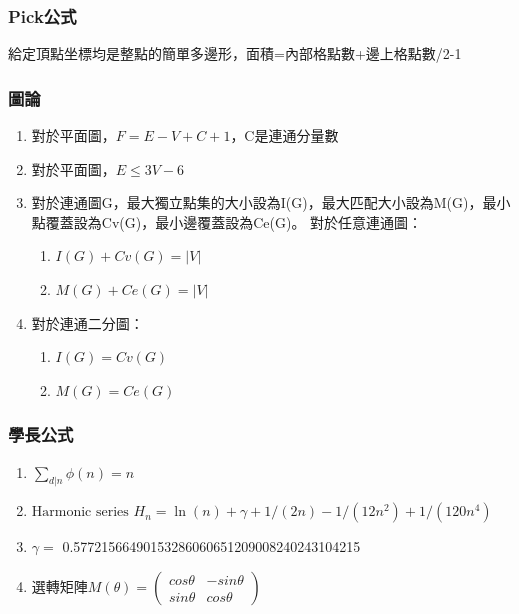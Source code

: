 %

\subsubsection{Pick公式}
給定頂點坐標均是整點的簡單多邊形，面積=內部格點數+邊上格點數/2-1

\subsubsection{圖論}
\begin{enumerate}\itemsep = -5pt
\item 對於平面圖，$F=E-V+C+1$，C是連通分量數
\item 對於平面圖，$E\leq 3V-6$
\item 對於連通圖G，最大獨立點集的大小設為I(G)，最大匹配大小設為M(G)，最小點覆蓋設為Cv(G)，最小邊覆蓋設為Ce(G)。
對於任意連通圖：
	\begin{enumerate}\itemsep = -3pt
	\item $I(G)+Cv(G)=|V|$
	\item $M(G)+Ce(G)=|V|$
	\end{enumerate}
\item 對於連通二分圖：
	\begin{enumerate}\itemsep = -3pt
	\item $I(G)=Cv(G)$
	\item $M(G)=Ce(G)$
	\end{enumerate}
\end{enumerate}

\subsubsection{學長公式}
\begin{enumerate}\itemsep = -3pt
\item $\sum_{d|n} \phi(n) = n$
\item $\text{Harmonic series } H_n = \ln(n) + \gamma + 1/(2n) - 1/(12n^2) + 1/(120n^4)$
\item $ \gamma =$ 0.57721566490153286060651209008240243104215
\item 選轉矩陣$M(\theta)= \left( \begin{array}{ccc}
cos\theta & -sin\theta \\ 
sin\theta &  cos\theta
\end{array} \right)$
\end{enumerate}

